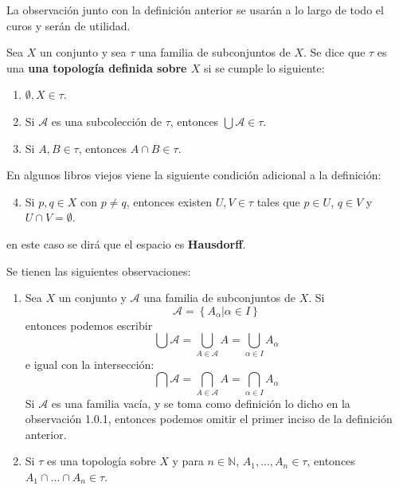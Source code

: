\documentclass[12pt]{report}
\theoremstyle{largebreak}
\begin{document}
    La observación junto con la definición anterior se usarán a lo largo de todo el curos y serán de utilidad.

    \begin{mydef} 
        Sea $X$ un conjunto y sea $\tau$ una familia de subconjuntos de $X$. Se dice que $\tau$ es una \textbf{una topología definida sobre $X$} si se cumple lo siguiente:
        \begin{enumerate}
            \item $\emptyset,X\in\tau$.
            \item Si $\mathcal{A}$ es una subcolección de $\tau$, entonces $\bigcup\mathcal{A}\in\tau$.
            \item Si $A,B\in\tau$, entonces $A\cap B\in\tau$.
        \end{enumerate}
    \end{mydef}

    \begin{obs}
        En algunos libros viejos viene la siguiente condición adicional a la definición:
        \begin{enumerate}
            \setcounter{enumi}{3}
            \item Si $p,q\in X$ con $p\neq q$, entonces existen $U, V\in\tau$ tales que $p\in U$, $q\in V$ y $U\cap V=\emptyset$.
        \end{enumerate}
        en este caso se dirá que el espacio es \textbf{Hausdorff}.
    \end{obs}

    \begin{obs}
        Se tienen las siguientes observaciones:
        \begin{enumerate}
            \item Sea $X$ un conjunto y $\mathcal{A}$ una familia de subconjuntos de $X$. Si
            \begin{equation*}
                \mathcal{A}=\left\{A_\alpha\big|\alpha\in I \right\}
            \end{equation*}
            entonces podemos escribir
            \begin{equation*}
                \bigcup\mathcal{A}=\bigcup_{A\in\mathcal{A}}A=\bigcup_{\alpha\in I}A_\alpha
            \end{equation*}
            e igual con la intersección:
            \begin{equation*}
                \bigcap\mathcal{A}=\bigcap_{A\in\mathcal{A}}A=\bigcap_{\alpha\in I}A_\alpha
            \end{equation*}
            Si $\mathcal{A}$ es una familia vacía, y se toma como definición lo dicho en la observación 1.0.1, entonces podemos omitir el primer inciso de la definición anterior.
            \item Si $\tau$ es una topología sobre $X$ y para $n\in\mathbb{N}$, $A_1,...,A_n\in\tau$, entonces $A_1\cap...\cap A_n\in\tau$.
        \end{enumerate}
    \end{obs}
\end{document}
